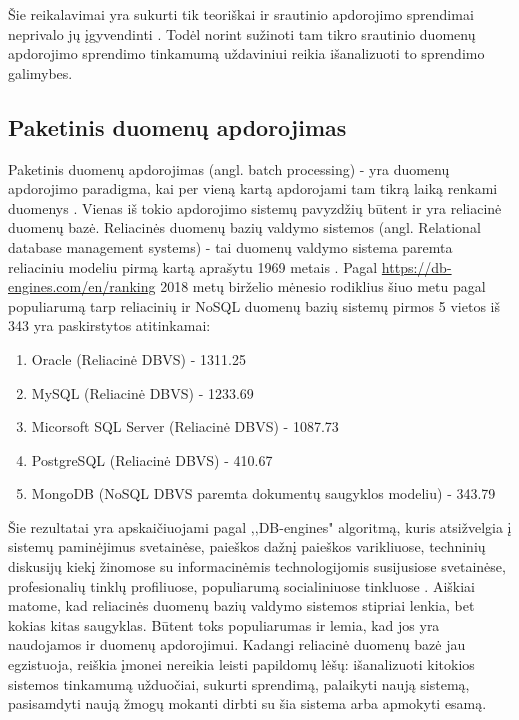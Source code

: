 \documentclass{VUMIFPSkursinis}
\begin{document}
    Šie reikalavimai yra sukurti tik teoriškai ir srautinio apdorojimo sprendimai neprivalo jų įgyvendinti \cite{stonebraker20058}. 
    Todėl norint sužinoti tam tikro srautinio duomenų apdorojimo sprendimo tinkamumą uždaviniui reikia išanalizuoti to sprendimo galimybes.                 
\subsection{Paketinis duomenų apdorojimas}
    Paketinis duomenų apdorojimas (angl. batch processing) - yra duomenų apdorojimo paradigma, kai per vieną kartą apdorojami tam tikrą laiką renkami duomenys \cite{batch}.
    Vienas iš tokio apdorojimo sistemų pavyzdžių būtent ir yra reliacinė duomenų bazė. Reliacinės duomenų bazių valdymo sistemos (angl. Relational database management systems) - tai 
    duomenų valdymo sistema paremta reliaciniu modeliu pirmą kartą aprašytu 1969 metais \cite{codd1969derivability}.
    Pagal \url{https://db-engines.com/en/ranking} 2018 metų birželio mėnesio rodiklius šiuo metu pagal populiarumą tarp reliacinių ir NoSQL duomenų bazių sistemų pirmos 5 vietos iš 343 yra paskirstytos atitinkamai:
    \begin{enumerate}
        \item Oracle (Reliacinė DBVS) - 1311.25
        \item MySQL (Reliacinė DBVS) - 1233.69
        \item Micorsoft SQL Server (Reliacinė DBVS) - 1087.73
        \item PostgreSQL (Reliacinė DBVS) - 410.67
        \item MongoDB (NoSQL DBVS paremta dokumentų saugyklos modeliu) - 343.79
    \end{enumerate}\par
        Šie rezultatai yra apskaičiuojami pagal ,,DB-engines" algoritmą, kuris atsižvelgia į sistemų paminėjimus svetainėse, paieškos dažnį paieškos varikliuose, techninių diskusijų kiekį
       žinomose su informacinėmis technologijomis susijusiose svetainėse, profesionalių tinklų profiliuose, populiarumą socialiniuose tinkluose \cite{dbengines}. Aiškiai matome, kad reliacinės
    duomenų bazių valdymo sistemos stipriai lenkia, bet kokias kitas saugyklas. Būtent toks populiarumas ir lemia, kad jos yra naudojamos ir duomenų apdorojimui. Kadangi reliacinė
    duomenų bazė jau egzistuoja, reiškia įmonei nereikia leisti papildomų lėšų: išanalizuoti kitokios sistemos tinkamumą užduočiai, sukurti sprendimą, palaikyti naują sistemą, 
    pasisamdyti naują žmogų mokanti dirbti su šia sistema arba apmokyti esamą. \par
\end{document}
